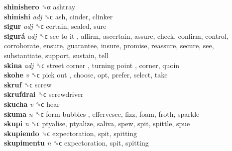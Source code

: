 \textbf{shinishero} ␝α  ashtray  \\
\textbf{shinishi} \emph{adj}  ␝ϲ  ash, cinder, clinker  \\
\textbf{sigur} \emph{adj}  ␝ϲ  certain, sealed, sure  \\
\textbf{sigurá} \emph{adj}  ␝ϲ   see to it , affirm, ascertain, assure, check, confirm, control, corroborate, ensure, guarantee, insure, promise, reassure, secure, see, substantiate, support, sustain, tell  \\
\textbf{skina} \emph{adj}  ␝ϲ   street corner ,  turning point , corner, quoin  \\
\textbf{skohe} \emph{v}  ␝ϲ   pick out , choose, opt, prefer, select, take  \\
\textbf{skruf} ␝ϲ  screw  \\
\textbf{skrufdrai} ␝ϲ  screwdriver  \\
\textbf{skucha} \emph{v}  ␝ϲ  hear  \\
\textbf{skuma} \emph{n}  ␝ϲ   form bubbles , effervesce, fizz, foam, froth, sparkle  \\
\textbf{skupi} \emph{n}  ␝ϲ  ptyalise, ptyalize, saliva, spew, spit, spittle, spue  \\
\textbf{skupiendo} ␝ϲ  expectoration, spit, spitting  \\
\textbf{skupimentu} \emph{n}  ␝ϲ  expectoration, spit, spitting  \\
